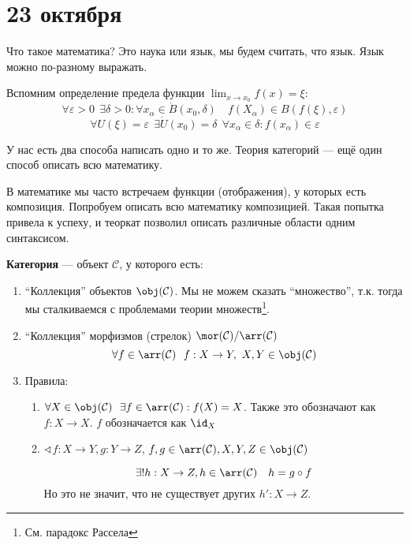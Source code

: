 \chapter{23 октября}

Что такое математика? Это наука или язык, мы будем считать, что язык. Язык можно по-разному выражать.

\begin{example}
    Вспомним определение предела функции \(\lim_{x \to x_0} f(x) = \xi\):
    \[\forall \varepsilon > 0 \ \ \exists \delta > 0 : \forall x_\alpha \in \dot{B}(x_0, \delta) \quad f(X_\alpha) \in B(f(\xi), \varepsilon)\]
    \[\forall U(\xi) = \varepsilon \ \ \exists \dot{U}(x_0) = \delta \ \ \forall x_\alpha \in \delta : f(x_\alpha) \in \varepsilon\]

    У нас есть два способа написать одно и то же. Теория категорий --- ещё один способ описать всю математику.
\end{example}

В математике мы часто встречаем функции (отображения), у которых есть композиция. Попробуем описать всю математику композицией. Такая попытка привела к успеху, и теоркат позволил описать различные области одним синтаксисом.

\begin{definition}
    \textbf{Категория} --- объект \(\mathcal{C}\), у которого есть:
    \begin{enumerate}
        \item ``Коллекция'' объектов \(\obj(\mathcal{C})\). Мы не можем сказать ``множество'', т.к. тогда мы сталкиваемся с проблемами теории множеств\footnote{См. парадокс Рассела}.
        \item ``Коллекция'' морфизмов (стрелок) \(\mor(\mathcal{C}) / \arr(\mathcal{C})\)
              \[\forall f \in \arr(\mathcal{C}) \ \ f : X \to Y, \ X, Y \in \obj(\mathcal{C})\]
        \item Правила: \begin{enumerate}
                  \item \(\forall X \in \obj(\mathcal{C}) \ \ \exists f \in \arr(\mathcal{C}) : f(X) = X\). Также это обозначают как \(f : X \to X\). \(f\) обозначается как \(\id_X\)
                  \item \(\sphericalangle f : X \to Y, g : Y \to Z\), \(f, g \in \arr(\mathcal{C}), X,Y,Z \in \obj(\mathcal{C})\)

                        \[\exists! h : X \to Z, h \in \arr(\mathcal{C}) \quad h = g \circ f\]
                        Но это не значит, что не существует других \(h' : X \to Z\).
              \end{enumerate}
    \end{enumerate}
\end{definition}

